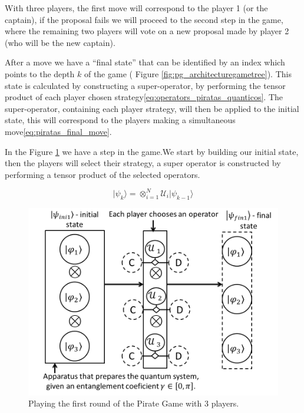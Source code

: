 With three players, the first move will correspond to the player 1 (or the captain), if the proposal fails we will proceed to the second step in the game, where the remaining two players will vote on a new proposal made by player 2 (who will be the new captain). 

After a move we have a ``final state'' that can be identified by an index which points to the depth $k$ of the game ( Figure \ref{fig:pg_architecturegametree}). This state is calculated by constructing a super-operator, by performing the tensor product of each player chosen strategy\ref{eq:operators_piratas_quanticos}. The super-operator, containing each player strategy, will then be applied to the initial state, this will correspond to the players making a simultaneous move\ref{eq:piratas_final_move}.

In the Figure \ref{fig:pg_architecture3players} we have a step in the game.We start by building our initial state, then the players will select their strategy, a super operator is constructed by performing a tensor product of the selected operators.

\begin{equation}
\vert\psi_{k}\rangle=\otimes_{i=1}^{N} \mathcal{U}_{i}\vert\psi_{k-1}\rangle\label{eq:piratas_final_move}
\end{equation}

\begin{figure}[h]
\centering 
\includegraphics[scale=0.35]{Figures/architecture/esquema/Slide1.png}
\caption{Playing the first round of the Pirate Game with 3 players. }
\label{fig:pg_architecture3players}
\end{figure}

